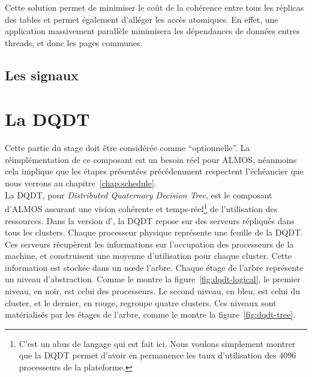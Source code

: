       Cette solution permet de minimiser le coût de la cohérence entre tous les
      réplicas des tables et permet également d'alléger les accès atomiques. En
      effet, une application massivement parallèle minimisera les dépendances de
      données entres threads, et donc les pages communes.


    \subsection{Les signaux}



  \section{La DQDT}
  \label{sec:dqdt}

    Cette partie du stage doit être considérée comme ``optionnelle''. La
    réimplémentation de ce composant est un besoin réel pour ALMOS, néanmoins
    cela implique que les étapes présentées précédemment respectent l'échéancier
    que nous verrons au chapitre~\ref{chap:schedule}.\\

    La DQDT, pour \textit{Distributed Quaternary Decision Tree}, est le
    composant d'ALMOS assurant une vision cohérente et temps-réel\footnote{C'est
      un abus de langage qui est fait ici. Nous voulons simplement montrer que
      la DQDT permet d'avoir en permanence les taux d'utilisation des 4096
      processeurs de la plateforme.} de l'utilisation des ressources. Dans la
    version d'\citet{almaless2014universite}, la DQDT repose sur des serveurs
    répliqués dans tous les clusters. Chaque processeur physique représente une
    feuille de la DQDT. Ces serveurs récupèrent les informations sur
    l'occupation des processeurs de la machine, et construisent une moyenne
    d'utilisation pour chaque cluster. Cette information est stockée dans un
    n\oe de l'arbre. Chaque étage de l'arbre représente un niveau
    d'abstraction. Comme le montre la figure~\ref{fig:dqdt-logical}, le premier
    niveau, en noir, est celui des processeurs. Le second niveau, en bleu, est
    celui du cluster, et le dernier, en rouge, regroupe quatre clusters. Ces
    niveaux sont matérialisés par les étages de l'arbre, comme le montre la
    figure~\ref{fig:dqdt-tree}.\\

